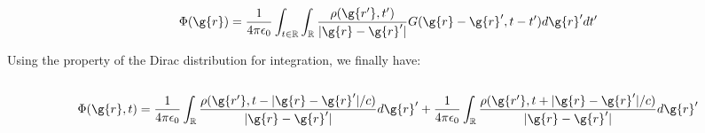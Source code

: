 \begin{equation}
 \Phi (\g{r}) = \frac{1}{4\pi\epsilon_0}\int_{t\in \mathbb{R}}\int_{\mathbb{R}}\frac{\rho(\g{r'},t')}{|\g{r}-\g{r}'|}G(\g{r}-\g{r}',t-t')d\g{r}'dt'
\end{equation}

\noindent Using the property of the Dirac distribution for integration, we finally have:\\

\noindent {}\\

\begin{equation}
 \Phi (\g{r},t) = \frac{1}{4\pi\epsilon_0}\int_{\mathbb{R}}\frac{\rho(\g{r'},t - |\g{r}-\g{r}'|/c)}{|\g{r}-\g{r}'|}d\g{r}'+\frac{1}{4\pi\epsilon_0}\int_{\mathbb{R}}\frac{\rho(\g{r'},t + |\g{r}-\g{r}'|/c)}{|\g{r}-\g{r}'|}d\g{r}'
\end{equation}





















